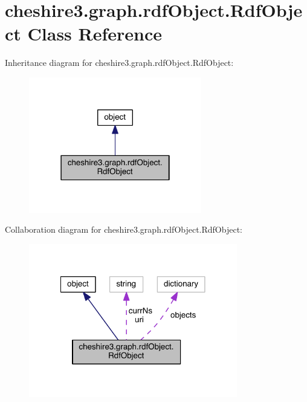 \hypertarget{classcheshire3_1_1graph_1_1rdf_object_1_1_rdf_object}{\section{cheshire3.\-graph.\-rdf\-Object.\-Rdf\-Object Class Reference}
\label{classcheshire3_1_1graph_1_1rdf_object_1_1_rdf_object}
}


Inheritance diagram for cheshire3.\-graph.\-rdf\-Object.\-Rdf\-Object\-:
\nopagebreak
\begin{figure}[H]
\begin{center}
\leavevmode
\includegraphics[width=214pt]{classcheshire3_1_1graph_1_1rdf_object_1_1_rdf_object__inherit__graph}
\end{center}
\end{figure}


Collaboration diagram for cheshire3.\-graph.\-rdf\-Object.\-Rdf\-Object\-:
\nopagebreak
\begin{figure}[H]
\begin{center}
\leavevmode
\includegraphics[width=258pt]{classcheshire3_1_1graph_1_1rdf_object_1_1_rdf_object__coll__graph}
\end{center}
\end{figure}
